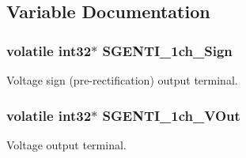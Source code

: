 \subsection{Variable Documentation}
\hypertarget{a00032_a5369a96cf47ea2fbd84a92ed4091b48b}{
\subsubsection[{S\-G\-E\-N\-T\-I\-\_\-1ch\-\_\-\-Sign}]{\setlength{\rightskip}{0pt plus 5cm}volatile int32$\ast$ S\-G\-E\-N\-T\-I\-\_\-1ch\-\_\-\-Sign}}\label{a00032_a5369a96cf47ea2fbd84a92ed4091b48b}
Voltage sign (pre-\/rectification) output terminal. \hypertarget{a00032_a5dba1fe543c9e62ef6cc8cf4179de951}{
\subsubsection[{S\-G\-E\-N\-T\-I\-\_\-1ch\-\_\-\-V\-Out}]{\setlength{\rightskip}{0pt plus 5cm}volatile int32$\ast$ S\-G\-E\-N\-T\-I\-\_\-1ch\-\_\-\-V\-Out}}\label{a00032_a5dba1fe543c9e62ef6cc8cf4179de951}
Voltage output terminal. 